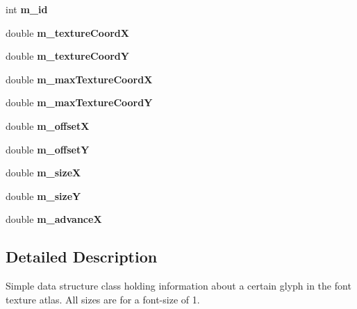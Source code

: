 \begin{DoxyCompactItemize}
\item 
\mbox{\label{classflounder_1_1character_abb280f071ad1d88797fdea541ac902bd}} 
int {\bfseries m\+\_\+id}
\item 
\mbox{\label{classflounder_1_1character_a05d4b071a3e5ada68462834c4770c5d3}} 
double {\bfseries m\+\_\+texture\+CoordX}
\item 
\mbox{\label{classflounder_1_1character_adb63d0e79f51d4e3b72b8fa2d5267cc2}} 
double {\bfseries m\+\_\+texture\+CoordY}
\item 
\mbox{\label{classflounder_1_1character_ae66ecc7b0ae8329ab00e3c5425be4650}} 
double {\bfseries m\+\_\+max\+Texture\+CoordX}
\item 
\mbox{\label{classflounder_1_1character_a0d45d1b5b061b1ad92bfa0dfcb8d8eb3}} 
double {\bfseries m\+\_\+max\+Texture\+CoordY}
\item 
\mbox{\label{classflounder_1_1character_a8fc09cc216a225e682bae81bda4e8cf3}} 
double {\bfseries m\+\_\+offsetX}
\item 
\mbox{\label{classflounder_1_1character_a3a9fe9ce66a993dc378c959838c9c395}} 
double {\bfseries m\+\_\+offsetY}
\item 
\mbox{\label{classflounder_1_1character_a85401b05cebbae9683f9e612b42b2019}} 
double {\bfseries m\+\_\+sizeX}
\item 
\mbox{\label{classflounder_1_1character_a64700822c775e92782274369607ff3ca}} 
double {\bfseries m\+\_\+sizeY}
\item 
\mbox{\label{classflounder_1_1character_a7a317fd9bb7b6e2c601d60b65b08a935}} 
double {\bfseries m\+\_\+advanceX}
\end{DoxyCompactItemize}


\subsection{Detailed Description}
Simple data structure class holding information about a certain glyph in the font texture atlas. All sizes are for a font-\/size of 1. 



